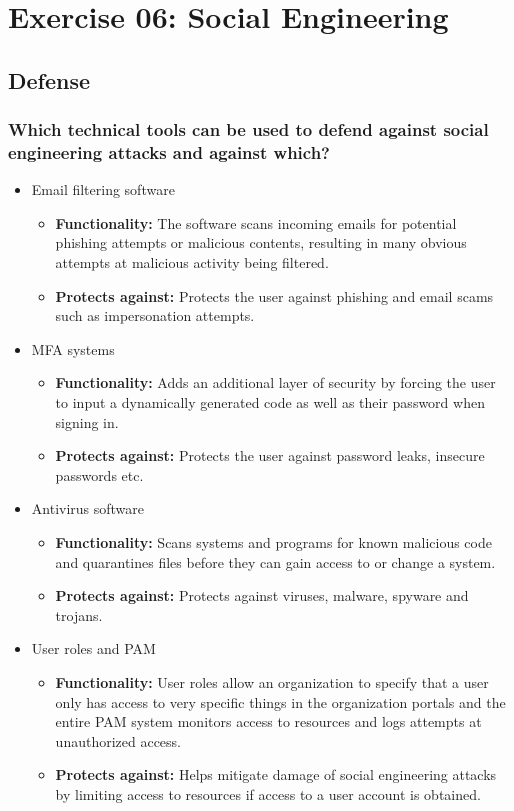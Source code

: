 \section{Exercise 06: Social Engineering}

\subsection{Defense}
\subsubsection{Which technical tools can be used to defend against social engineering attacks and against which?}
\begin{itemize}
    \item Email filtering software
          \begin{itemize}
              \item \textbf{Functionality: } The software scans incoming emails for potential phishing attempts or malicious contents, resulting in many obvious attempts at malicious activity being filtered.
              \item \textbf{Protects against: } Protects the user against phishing and email scams such as impersonation attempts.
          \end{itemize}
    \item MFA systems
          \begin{itemize}
              \item \textbf{Functionality: } Adds an additional layer of security by forcing the user to input a dynamically generated code as well as their password when signing in.
              \item \textbf{Protects against: } Protects the user against password leaks, insecure passwords etc.
          \end{itemize}
    \item Antivirus software
          \begin{itemize}
              \item \textbf{Functionality: } Scans systems and programs for known malicious code and quarantines files before they can gain access to or change a system.
              \item \textbf{Protects against: } Protects against viruses, malware, spyware and trojans.
          \end{itemize}
    \item User roles and PAM
          \begin{itemize}
              \item \textbf{Functionality: } User roles allow an organization to specify that a user only has access to very specific things in the organization portals and the entire PAM system monitors access to resources and logs attempts at unauthorized access.
              \item \textbf{Protects against: } Helps mitigate damage of social engineering attacks by limiting access to resources if access to a user account is obtained.
          \end{itemize}
\end{itemize}
